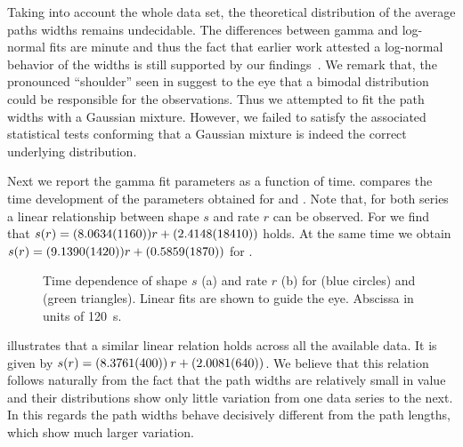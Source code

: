 		Taking into account the whole data set, the theoretical distribution of the average paths widths remains undecidable. The differences between gamma and log-normal fits are minute and thus the fact that earlier work attested a log-normal behavior of the widths is still supported by our findings~\cite{baumgarten2010plasmodial}. We remark that, the pronounced ``shoulder'' seen in  suggest to the eye that a bimodal distribution could be responsible for the observations. Thus we attempted to fit the path widths with a Gaussian mixture. However, we failed to satisfy the associated statistical tests conforming that a Gaussian mixture is indeed the correct underlying distribution.

		Next we report the gamma fit parameters as a function of time.  compares the time development of the parameters obtained for  and . Note that, for both series a linear relationship between shape $s$ and rate $r$ can be observed. For  we find that $s(r) = (\num{8.0634 \pm 0.116}) r + (\num{2.4148 \pm 1.841})$ holds. At the same time we obtain $s(r) = (\num{9.1390 \pm 0.142}) r + (\num{0.5859 \pm 0.187})$ for .
		
		\begin{figure}
			\centering
			\qquad

			\caption[Path width distribution - Fit parameters]{Time dependence of shape $s$ (a) and rate $r$ (b) for  (blue circles) and  (green triangles). Linear fits are shown to guide the eye. Abscissa in units of \SI{120}{\second}.}
			\label{fig:path_width_fit_parameters}
		\end{figure}


		 illustrates that a similar linear relation holds across all the available data. It is given by $s(r) = (\num{8.3761 \pm 0.040})\: r + (\num{2.0081 \pm 0.064})$. We believe that this relation follows naturally from the fact that the path widths are relatively small in value and their distributions show only little variation from one data series to the next. In this regards the path widths behave decisively different from the path lengths, which show much larger variation.

